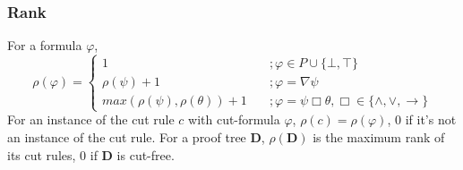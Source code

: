 \subsubsection{Rank} For a formula $\varphi$,
\[ \rho(\varphi) = \begin{cases}
1 & \quad ; \varphi \in P \cup \{ \bot, \top \} \\
\rho(\psi) + 1 & \quad ; \varphi = \nabla \psi \\
max(\rho(\psi), \rho(\theta)) + 1 & \quad ; \varphi = \psi \Box \theta, \Box \in \{ \land , \lor, \rightarrow \}
\end{cases} \]
For an instance of the cut rule $c$ with cut-formula $\varphi$, $\rho(c) = \rho(\varphi)$, $0$ if it's not an instance of the cut rule.
For a proof tree $\mathbf{D}$, $\rho(\mathbf{D})$ is the maximum rank of its cut rules, $0$ if $\mathbf{D}$ is cut-free.
